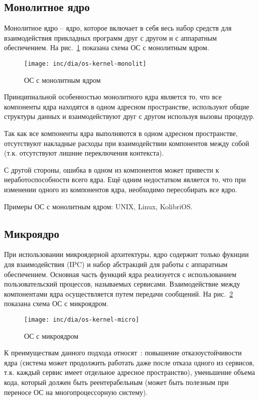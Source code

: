 \subsection{Монолитное ядро}
Монолитное ядро -- ядро, которое включает в себя весь набор средств для
взаимодействия прикладных программ друг с другом и с аппаратным обеспечением.
На рис.~\ref{fig:os-kernel-monolit} показана схема ОС с монолитным ядром.

\begin{figure}[ht!]
  \centering
  \texttt{[image: inc/dia/os-kernel-monolit]}
  \caption{ОС с монолитным ядром}
  \label{fig:os-kernel-monolit}
\end{figure}

Принципиальной особенностью монолитного ядра является то, что все компоненты
ядра находятся в одном адресном пространстве, используют общие структуры
данных и взаимодействуют друг с другом используя вызовы процедур.

Так как все компоненты ядра выполняются в одном адресном пространстве,
отсутствуют накладные расходы при взаимодействии компонентов между собой (т.к.
отсутствуют лишние переключения контекста).

С другой стороны, ошибка в одном из компонентов может привести к
неработоспособности всего ядра. Ещё одним недостатком является то,
что при изменении одного из компонентов ядра, необходимо
пересобирать все ядро.

Примеры ОС с монолитным ядром: UNIX, Linux, KolibriOS.

\subsection{Микроядро}
При использовании микроядерной архитектуры, ядро содержит только фукнции для
взаимодействия (IPC) и набор абстракций для работы с аппаратным обеспечением.
Основная часть функций ядра реализуется с использованием пользовательский
процессов, называемых сервисами. Взаимодействие между компонентами ядра
осуществляется путем передачи сообщений. На рис.~\ref{fig:os-kernel-micro} показана
схема ОС с микроядром.

\begin{figure}[ht!]
  \centering
  \texttt{[image: inc/dia/os-kernel-micro]}
  \caption{ОС с микроядром}
  \label{fig:os-kernel-micro}
\end{figure}

К преимуществам данного подхода относят~\cite{os_dev}: повышение
отказоустойчивости ядра (система может продолжить работать даже после
отказа одного из сервисов, т.к. каждый сервис имеет отдельное адресное
пространство), уменьшение объема кода, который должен быть реентерабельным
(может быть полезным при переносе ОС на многопроцессорную систему).

